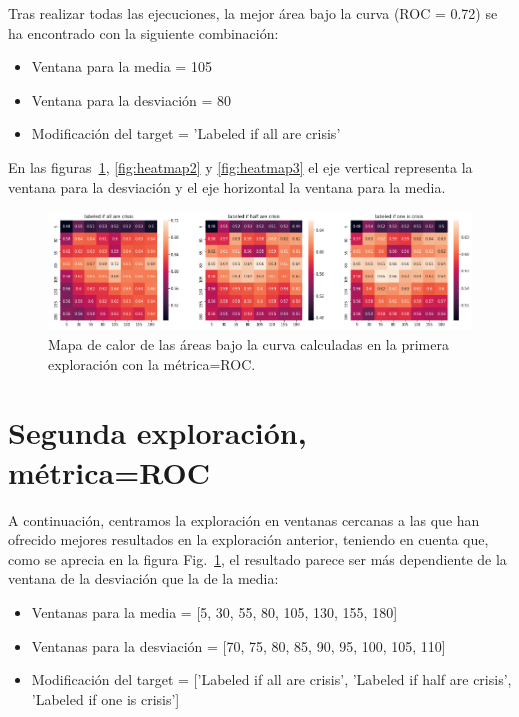 \documentclass[a4paper,12pt,twoside,oldfontcommands]{memoir}
\begin{document}
Tras realizar todas las ejecuciones, la mejor área bajo la curva (ROC = 0.72) se ha encontrado con la siguiente combinación: 
\begin{itemize}
    \item Ventana para la media = 105
    \item Ventana para la desviación = 80
    \item Modificación del target = 'Labeled if all are crisis'
\end{itemize}

En las figuras~\ref{fig:heatmap1}, \ref{fig:heatmap2} y \ref{fig:heatmap3} el eje vertical representa la ventana para la desviación y el eje horizontal la ventana para la media. 

\begin{figure}
    \centering
    \includegraphics[width=1\textwidth]{images/heatmap1.png}
    \caption{Mapa de calor de las áreas bajo la curva calculadas en la primera exploración con la métrica=ROC.}
    \label{fig:heatmap1}
\end{figure}

\section{Segunda exploración, métrica=ROC}

A continuación, centramos la exploración en ventanas cercanas a las que han ofrecido mejores resultados en la exploración anterior, teniendo en cuenta que, como se aprecia en la figura Fig.~\ref{fig:heatmap1}, el resultado parece ser más dependiente de la ventana de la desviación que la de la media: 
\begin{itemize}
    \item Ventanas para la media = [5, 30, 55, 80, 105, 130, 155, 180]
    \item Ventanas para la desviación = [70, 75, 80, 85, 90, 95, 100, 105, 110]
    \item Modificación del target = ['Labeled if all are crisis', 'Labeled if half are crisis', 'Labeled if one is crisis']
\end{itemize}
\end{document}
